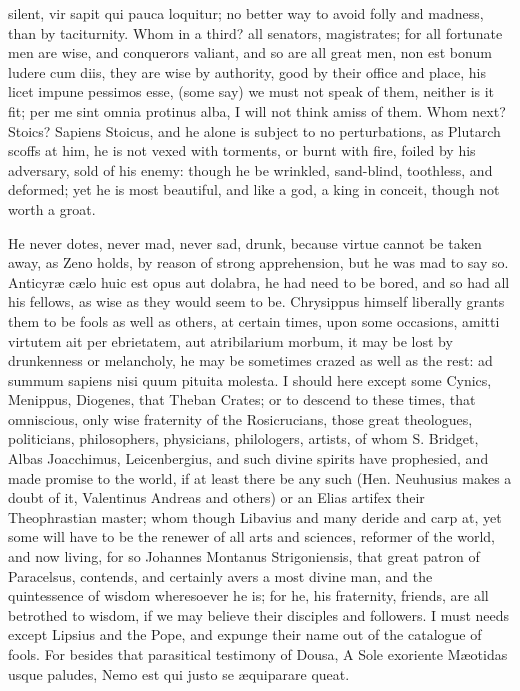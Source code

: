 {silent, vir sapit qui pauca loquitur; no better way to avoid folly
and madness, than by taciturnity. Whom in a third? all senators,
magistrates; for all fortunate men are wise, and conquerors valiant,
and so are all great men, non est bonum ludere cum diis, they are wise
by authority, good by their office and place, his licet impune pessimos
esse, (some say) we must not speak of them, neither is it fit; per me
sint omnia protinus alba, I will not think amiss of them. Whom next?
Stoics? Sapiens Stoicus, and he alone is subject to no perturbations,
as Plutarch scoffs at him, he is not vexed with torments, or burnt
with fire, foiled by his adversary, sold of his enemy: though he be
wrinkled, sand-blind, toothless, and deformed; yet he is most
beautiful, and like a god, a king in conceit, though not worth a groat.

He never dotes, never mad, never sad, drunk, because virtue cannot be
taken away, as Zeno holds, by reason of strong apprehension, but
he was mad to say so. Anticyr\ae{} c\ae{}lo huic est opus aut dolabra,
he had need to be bored, and so had all his fellows, as wise as they
would seem to be. Chrysippus himself liberally grants them to be fools
as well as others, at certain times, upon some occasions, amitti
virtutem ait per ebrietatem, aut atribilarium morbum, it may be lost by
drunkenness or melancholy, he may be sometimes crazed as well as the
rest: ad summum sapiens nisi quum pituita molesta. I should here
except some Cynics, Menippus, Diogenes, that Theban Crates; or to
descend to these times, that omniscious, only wise fraternity of
the Rosicrucians, those great theologues, politicians, philosophers,
physicians, philologers, artists, \etc{} of whom S. Bridget, Albas
Joacchimus, Leicenbergius, and such divine spirits have prophesied, and
made promise to the world, if at least there be any such (Hen.
Neuhusius makes a doubt of it,  Valentinus Andreas and
others) or an Elias artifex their Theophrastian master; whom though
Libavius and many deride and carp at, yet some will have to be the
renewer of all arts and sciences, reformer of the world, and now
living, for so Johannes Montanus Strigoniensis, that great patron of
Paracelsus, contends, and certainly avers a most divine man, and
the quintessence of wisdom wheresoever he is; for he, his fraternity,
friends, \etc{} are all betrothed to wisdom, if we may believe their
disciples and followers. I must needs except Lipsius and the Pope, and
expunge their name out of the catalogue of fools. For besides that
parasitical testimony of Dousa,
A Sole exoriente M\ae{}otidas usque paludes,
Nemo est qui justo se \ae{}quiparare queat.

}
